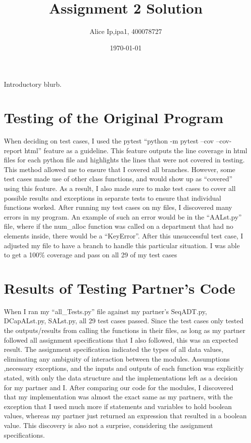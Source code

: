 \documentclass[12pt]{article}
\title{Assignment 2 Solution}
\author{Alice Ip,ipa1, 400078727}
\date{\today}
\begin{document}
\maketitle

Introductory blurb.

\section{Testing of the Original Program}

When deciding on test cases, I used the pytest ``python -m pytest --cov --cov-report html'' feature as a guideline. This feature outputs the line coverage in html files for each python file and highlights the lines that were not covered in testing. This method allowed me to ensure that I covered all branches. However, some test cases made use of other class functions, and would show up as ``covered'' using this feature. As a result, I also made sure to make test cases to cover all possible results and exceptions in separate tests to ensure that individual functions worked. After running my test cases on my files, I discovered many errors in my program. An example of  such an error would be in the ``AALst.py'' file, where if the num\_alloc function was called on a department that had no elements inside, there would be a ``KeyError''. After this unsuccessful test case, I adjusted my file to have a branch to handle this particular situation. I was able to get a 100\% coverage  and pass on all 29 of my test cases


\section{Results of Testing Partner's Code}

When I ran my ``all\_Tests.py'' file against my partner's SeqADT.py, DCapALst.py, SALst.py, all 29 test cases passed. Since the test cases only tested the outputs/results from calling the functions in their files, as long as my partner followed all assignment specifications that I also followed, this was an expected result. The assignment specification indicated the types of all data values, eliminating any ambiguity of interaction between the modules. Assumptions ,necessary exceptions, and the inputs and outputs of each function was explicitly stated, with only the data structure and the implementations left as a decision for my partner and I. After comparing our code for the modules, I discovered that my implementation was almost the exact same as my partners, with the exception that I used much more if statements and variables to hold boolean values, whereas my partner just returned an expression that resulted in a boolean value. This discovery is also not a surprise, considering the assignment specifications.
\end{document}

